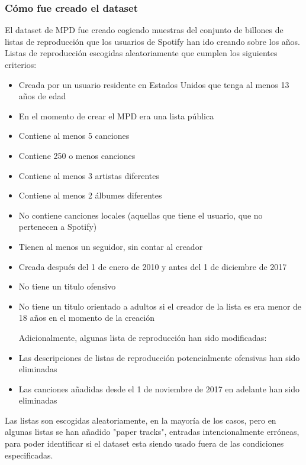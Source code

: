\documentclass{article}
\begin{document}
	\subsubsection{Cómo fue creado el dataset}
	El dataset de MPD fue creado cogiendo muestras del conjunto de billones de listas de reproducción que los usuarios de Spotify han ido creando sobre los años. Listas de reproducción escogidas aleatoriamente que cumplen los siguientes criterios:
	\begin{itemize}
		\item Creada por un usuario residente en Estados Unidos que tenga al menos 13 años de edad
		\item En el momento de crear el MPD era una lista pública
		\item Contiene al menos 5 canciones
		\item Contiene 250 o menos canciones
		\item Contiene al menos 3 artistas diferentes
		\item Contiene al menos 2 álbumes diferentes
		\item No contiene canciones locales (aquellas que tiene el usuario, que no pertenecen a Spotify)
		\item Tienen al menos un seguidor, sin contar al creador
		\item Creada después del 1 de enero de 2010 y antes del 1 de diciembre de 2017
		\item No tiene un titulo ofensivo
		\item No tiene un titulo orientado a adultos si el creador de la lista es era menor de 18 años en el momento de la creación

	Adicionalmente, algunas lista de reproducción han sido modificadas:
		\item Las descripciones de listas de reproducción potencialmente ofensivas han sido eliminadas
		\item Las canciones añadidas desde el 1 de noviembre de 2017 en adelante han sido eliminadas
	\end{itemize}
	Las listas son escogidas aleatoriamente, en la mayoría de los casos, pero en algunas listas se han añadido "paper tracks", entradas intencionalmente erróneas, para poder identificar si el dataset esta siendo usado fuera de las condiciones especificadas.
\end{document}
